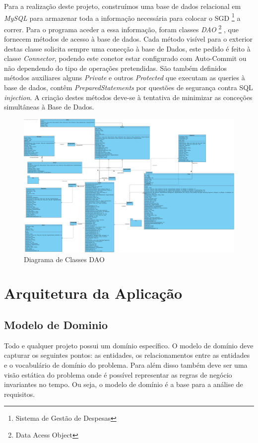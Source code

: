 Para a realização deste projeto, construímos uma base de dados relacional em \textit{MySQL} para armazenar toda a informação necessária para colocar o SGD \footnote{Sistema de Gestão de Despesas} a correr. Para o programa aceder a essa informação, foram classes \textit{DAO} \footnote{Data Acess Object} , que fornecem métodos de acesso à base de dados. Cada método visível para o exterior
destas classe solicita sempre uma conecção à base de Dados, este pedido é feito à classe \textit{Connector}, podendo este conetor estar configurado com Auto-Commit ou não dependendo do tipo de operações pretendidas.
São também definidos métodos auxiliares alguns \textit{Private} e outros \textit{Protected} que executam as queries à base de dados, contêm \textit{PreparedStatements} por questões de segurança contra SQL \textit{injection}. A criação destes métodos deve-se à tentativa de minimizar as conceções simultâneas à Base de Dados.


\begin{figure}[htb!]
	\centering
	\includegraphics[scale=0.2]{imagens/diagramaClasses/DiagramaClasseDAO}  
	\caption{Diagrama de Classes DAO  }  
\end{figure}


\chapter{Arquitetura da Aplicação}

\section{Modelo de Dominio }
Todo e qualquer projeto possui um domínio específico. O modelo de domínio deve capturar os seguintes pontos: as entidades, os relacionamentos entre as entidades e o vocabulário de domínio do problema. Para além disso também deve ser uma visão estática do problema onde é possível representar as regras de negócio invariantes no tempo. Ou seja, o modelo de domínio é a base para a análise de requisitos.

